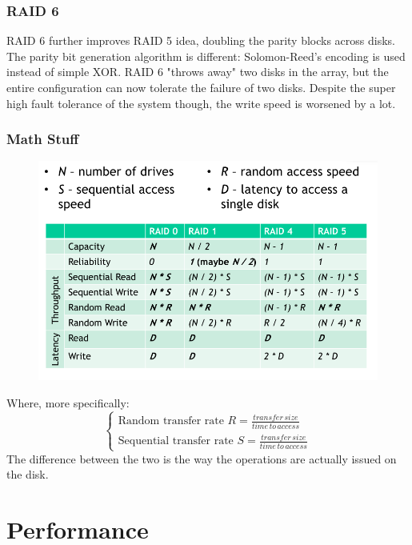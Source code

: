 \documentclass{article}
\begin{document}
				\subsubsection{RAID 6}
					RAID 6 further improves RAID 5 idea, doubling the parity blocks across disks. The parity bit generation algorithm is different: Solomon-Reed's encoding is used instead of simple XOR. RAID 6 "throws away" two disks in the array, but the entire configuration can now tolerate the failure of two disks. Despite the super high fault tolerance of the system though, the write speed is worsened by a lot.
					
				\subsubsection{Math Stuff}
					\begin{figure}[H]
						\centering
						\includegraphics[width = \textwidth]{./images/raids.png}
					\end{figure}
					Where, more specifically:
					\begin{equation}
						\begin{cases}
							\text{Random transfer rate } R = \frac{transfer\, size}{time\, to\, access}\\
							\text{Sequential transfer rate } S = \frac{transfer\, size}{time\, to\, access}
						\end{cases}
					\end{equation}
					The difference between the two is the way the operations are actually issued on the disk.

		\section{Performance}
\end{document}
